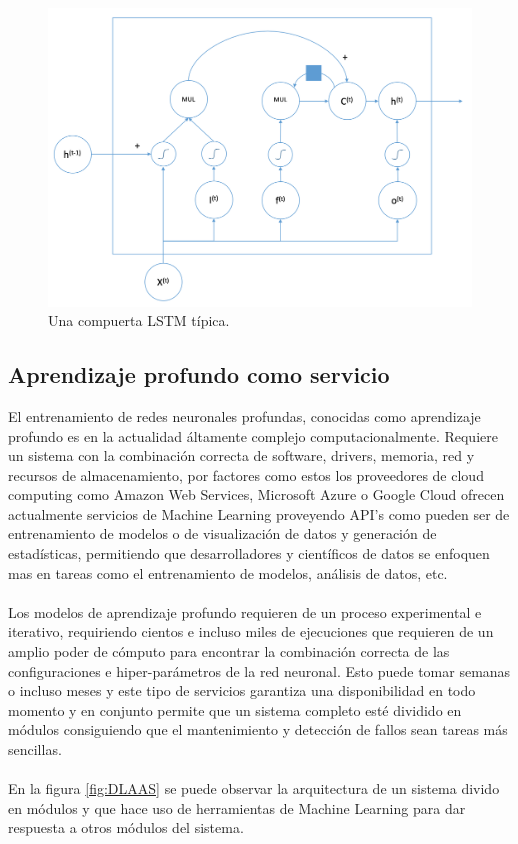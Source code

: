    	\begin{figure}
   		\centering
   		\includegraphics[width=\textwidth]{capitulo2/images/lstm}
   		\caption{Una compuerta LSTM típica.}
   		\label{fig:lstm}
   	\end{figure}
   	
   	

\newpage
\subsection{Aprendizaje profundo como servicio}
El entrenamiento de redes neuronales profundas, conocidas como aprendizaje profundo es en la actualidad áltamente complejo computacionalmente. Requiere un sistema con la combinación correcta de software, drivers, memoria, red y recursos de almacenamiento, por factores como estos los proveedores de cloud computing como Amazon Web Services, Microsoft Azure o Google Cloud ofrecen actualmente servicios de Machine Learning proveyendo API's como pueden ser de entrenamiento de modelos o de visualización de datos y generación de estadísticas, permitiendo que desarrolladores y científicos de datos se enfoquen mas en tareas como el entrenamiento de modelos, análisis de datos, etc.
\\\\
Los modelos de aprendizaje profundo requieren de un proceso experimental e iterativo, requiriendo cientos e incluso miles de ejecuciones que requieren de un amplio poder de cómputo para encontrar la combinación correcta de las configuraciones e hiper-parámetros de la red neuronal. Esto puede tomar semanas o incluso meses y este tipo de servicios garantiza una disponibilidad en todo momento y en conjunto permite que un sistema completo esté dividido en módulos consiguiendo que el mantenimiento y detección de fallos sean tareas más sencillas.
\\\\ 
En la figura \ref{fig:DLAAS} se puede observar la arquitectura de un sistema divido en módulos y que hace uso de herramientas de Machine Learning para dar respuesta a otros módulos del sistema.

